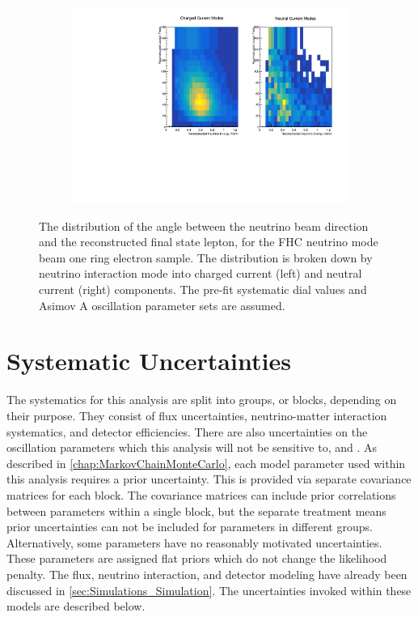 \begin{figure}[h]
  \begin{subfigure}[t]{\textwidth}
    \includegraphics[width=\textwidth, trim={0mm 0mm 0mm 0mm}, clip,page=1]{Figures/Selections/2DSpectra_FHC1Re-2020.pdf}
  \end{subfigure}
  \caption{The distribution of the angle between the neutrino beam direction and the reconstructed final state lepton, for the FHC neutrino mode beam one ring electron sample. The distribution is broken down by neutrino interaction mode into charged current (left) and neutral current (right) components. The pre-fit systematic dial values and Asimov A oscillation parameter sets are assumed.}
  \label{fig:SelsAndSysts_Beam_FHC1ReThetaSpectra}
\end{figure}

\clearpage
\section{Systematic Uncertainties}
\label{sec:SelsAndSysts_Systs}

The systematics for this analysis are split into groups, or blocks, depending on their purpose. They consist of flux uncertainties, neutrino-matter interaction systematics, and detector efficiencies. There are also uncertainties on the oscillation parameters which this analysis will not be sensitive to, \delmsqsol and \sinsqsol. As described in \autoref{chap:MarkovChainMonteCarlo}, each model parameter used within this analysis requires a prior uncertainty. This is provided via separate covariance matrices for each block. The covariance matrices can include prior correlations between parameters within a single block, but the separate treatment means prior uncertainties can not be included for parameters in different groups. Alternatively, some parameters have no reasonably motivated uncertainties. These parameters are assigned flat priors which do not change the likelihood penalty. The flux, neutrino interaction, and detector modeling have already been discussed in \autoref{sec:Simulations_Simulation}. The uncertainties invoked within these models are described below.

